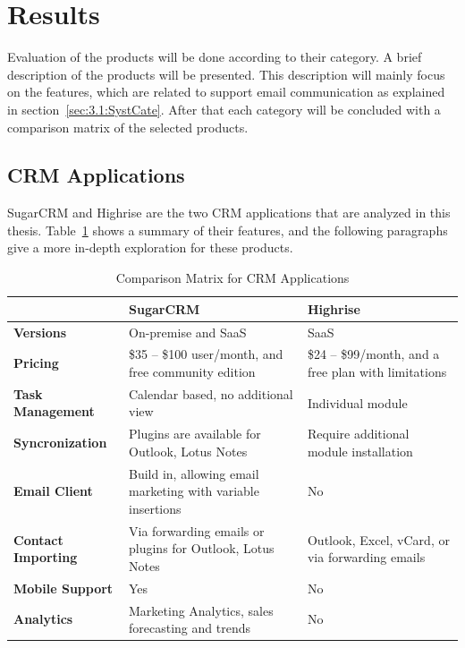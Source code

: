 \section{Results}
\label{sec:3.3:Resul}
Evaluation of the products will be done according to their category. A brief description of the products will be presented. This description will mainly focus on the features, which are related to support email communication as explained in section~\ref{sec:3.1:SystCate}. After that each category will be concluded with a comparison matrix of the selected products.

\subsection{CRM Applications}
\label{subsec:3.3.1:CRMAppl}

SugarCRM and Highrise are the two \ac{CRM} applications that are analyzed in this thesis. Table~\ref{tab:comp_matr_crm} shows a summary of their features, and the following paragraphs give a more in-depth exploration for these products.

\clearpage

\begin{table}[H]
\begin{center}
	\caption[Comparison Matrix for CRM Applications]{Comparison Matrix for CRM Applications} \label{tab:comp_matr_crm}
    \begin{tabular}{ | p{3cm} | p{5cm} | p{5cm} | }
	\hline
	& \textbf{SugarCRM} & \textbf{Highrise} \\ \hline
	\textbf{Versions} & On-premise and SaaS & SaaS \\ \hline
	\textbf{Pricing} & \$35 -- \$100 user/month, and free community edition & \$24 -- \$99/month, and a free plan with limitations \\ \hline
	\textbf{Task Management} & Calendar based, no additional view & Individual module \\ \hline
	\textbf{Syncronization} & Plugins are available for Outlook, Lotus Notes & Require additional module installation \\ \hline
	\textbf{Email Client} & Build in, allowing email marketing with variable insertions & No \\ \hline
	\textbf{Contact Importing} & Via forwarding emails or plugins for Outlook, Lotus Notes & Outlook, Excel, vCard, or via forwarding emails \\ \hline
	\textbf{Mobile Support} & Yes & No \\ \hline
	\textbf{Analytics} & Marketing Analytics, sales forecasting and trends & No \\ \hline
    \end{tabular}
\end{center}
\end{table}

